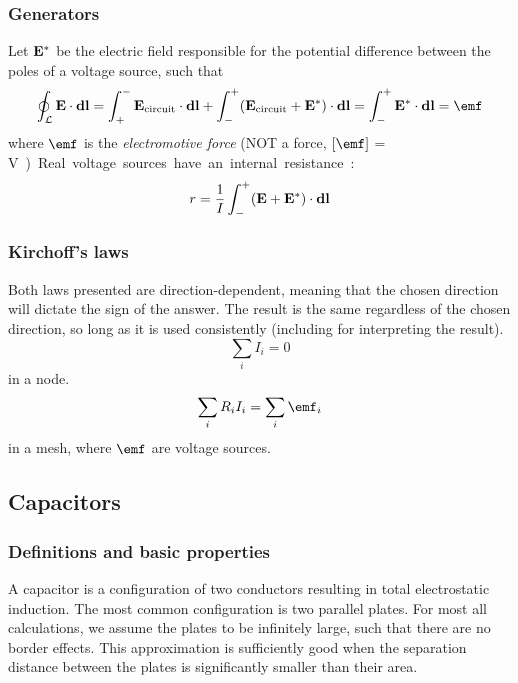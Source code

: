     \subsubsection{Generators}
        Let $\mathbf{E}^*$ be the electric field responsible for the potential difference between the poles of a voltage source, such that
        \begin{equation}
            \label{emf}
            \oint_\mathcal{L} \E\cdot \vec{dl} = \int_+^-\E_{\text{circuit}}\cdot \vec{dl} + \int_-^+(\E_{\text{circuit}} + \E^*)\cdot \vec{dl} = \int_-^+\E^*\cdot \vec{dl} = \emf
        \end{equation}
        where $\emf$ is the \textit{electromotive force} (NOT a force, $\left[\emf\right]$ = \si\volt)
        
        Real voltage sources have an internal resistance:
        \begin{equation}
            r = \frac{1}{I}\int_-^+(\mathbf{E} + \mathbf{E}^*)\cdot\mathbf{dl}
        \end{equation}
        
    \subsubsection{Kirchoff's laws}
        Both laws presented are direction-dependent, meaning that the chosen direction will dictate the sign of the answer. 
        The result is the same regardless of the chosen direction, so long as it is used consistently (including for interpreting the result).
        \begin{equation}
            \sum_i I_i = 0
        \end{equation}
        in a node.
        \begin{equation}
            \sum_i R_iI_i = \sum_i \emf_i
        \end{equation}
        in a mesh, where $\emf$ are voltage sources. 

\subsection{Capacitors}
    \label{capacitors}
    \subsubsection{Definitions and basic properties}
        A capacitor is a configuration of two conductors resulting in total electrostatic induction. 
        The most common configuration is  two parallel plates.
        For most all calculations, we assume the plates to be infinitely large, such that there are no border effects. 
        This approximation is sufficiently good when the separation distance between the plates is significantly smaller than their area.
        
